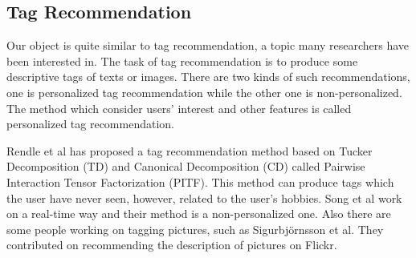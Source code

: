 \subsection{Tag Recommendation}
%
%
%
Our object is quite similar to tag recommendation, a topic many researchers have
been interested in. The task of tag recommendation is to produce some descriptive
tags of texts or images.
There are two kinds of such recommendations, one is
personalized tag recommendation while the other one is non-personalized.
The method which consider users' interest and other features is called personalized
tag recommendation.

Rendle et al\cite{rendle2010pairwise} has proposed a tag recommendation method
based on Tucker Decomposition (TD) and Canonical Decomposition (CD) called Pairwise
Interaction Tensor Factorization (PITF). This method can produce tags which the
user have never seen, however, related to the user's hobbies. Song et
al\cite{song2008real} work on a real-time way and their method is a non-personalized one. Also there are some people working on tagging pictures, such
as Sigurbj{\"o}rnsson et al\cite{sigurbjornsson2008flickr}. They contributed on
recommending the description of pictures on Flickr.

